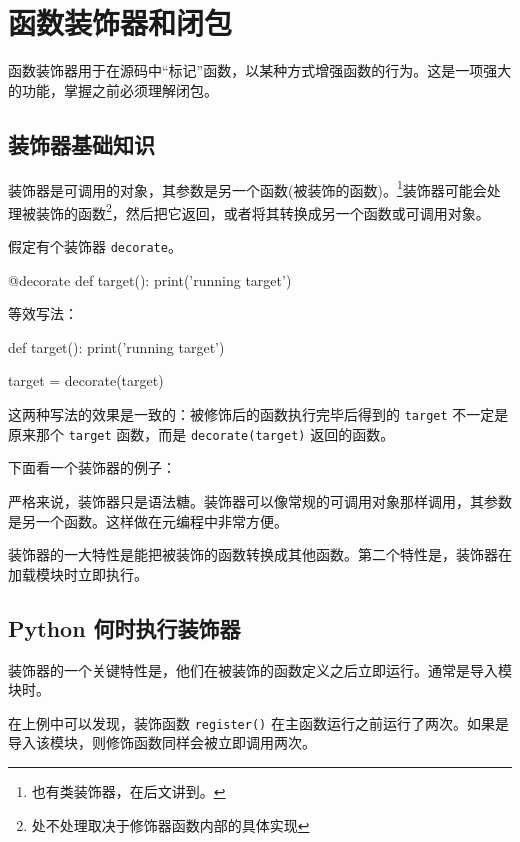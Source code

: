 \section{函数装饰器和闭包}

函数装饰器用于在源码中``标记''函数，以某种方式增强函数的行为。这是一项强大的功能，掌握之前必须理解闭包。

\subsection{装饰器基础知识}

装饰器是可调用的对象，其参数是另一个函数(被装饰的函数)。\footnote{也有类装饰器，在后文讲到。}装饰器可能会处理被装饰的函数\footnote{处不处理取决于修饰器函数内部的具体实现}，然后把它返回，或者将其转换成另一个函数或可调用对象。

假定有个装饰器 \texttt{decorate}。

\begin{python}
@decorate
def target():
    print('running target')
\end{python}

等效写法：

\begin{python}
def target():
    print('running target')

target = decorate(target)
\end{python}

这两种写法的效果是一致的：被修饰后的函数执行完毕后得到的 \texttt{target} 不一定是原来那个 \texttt{target} 函数，而是 \texttt{decorate(target)} 返回的函数。

下面看一个装饰器的例子：



严格来说，装饰器只是语法糖。装饰器可以像常规的可调用对象那样调用，其参数是另一个函数。这样做在元编程中非常方便。

装饰器的一大特性是能把被装饰的函数转换成其他函数。第二个特性是，装饰器在加载模块时立即执行。

\subsection{Python 何时执行装饰器}

装饰器的一个关键特性是，他们在被装饰的函数定义之后立即运行。通常是导入模块时。



在上例中可以发现，装饰函数 \texttt{register()} 在主函数运行之前运行了两次。如果是导入该模块，则修饰函数同样会被立即调用两次。


